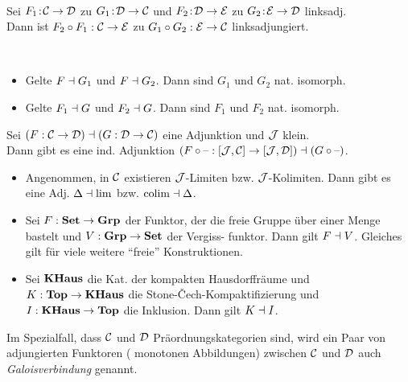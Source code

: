 \documentclass{cheat-sheet}
\begin{document}
\begin{lem}\mbox{}\\
  Sei $F_1 \!:\! \mathcal{C} \to \mathcal{D}$ zu $G_1 \!:\! \mathcal{D} \to \mathcal{C}$ und $F_2 \!:\! \mathcal{D} \to \mathcal{E}$ zu $G_2 \!:\! \mathcal{E} \to \mathcal{D}$ linksadj. \\
  Dann ist $F_2 \circ F_1 : \mathcal{C} \to \mathcal{E}$ zu $G_1 \circ G_2 : \mathcal{E} \to \mathcal{C}$ linksadjungiert.
\end{lem}

\begin{lem}\mbox{}\\
  \begin{itemize}
    \item Gelte $F \dashv G_1$ und $F \dashv G_2$. Dann sind $G_1$ und $G_2$ nat. isomorph.
    \item Gelte $F_1 \dashv G$ und $F_2 \dashv G$. Dann sind $F_1$ und $F_2$ nat. isomorph.
  \end{itemize}
\end{lem}

\begin{bem}
  Sei $(F : \mathcal{C} \to \mathcal{D}) \dashv (G : \mathcal{D} \to \mathcal{C})$ eine Adjunktion und $\mathcal{J}$ klein. \\
  Dann gibt es eine ind. Adjunktion $(F \circ \text{--} : [\mathcal{J}, \mathcal{C}] \to [\mathcal{J}, \mathcal{D}]) \dashv (G \circ \text{--})$.
\end{bem}

\begin{bspe}
  \begin{itemize}
    \item Angenommen, in $\mathcal{C}$ existieren $\mathcal{J}$-Limiten bzw. $\mathcal{J}$-Kolimiten. Dann gibt es eine Adj.
    $\Delta \dashv \lim$
    bzw.
    $\operatorname{colim} \dashv \Delta$.
    \item Sei $F : \mathbf{Set} \to \mathbf{Grp}$ der Funktor, der die freie Gruppe über einer Menge bastelt und $V : \mathbf{Grp} \to \mathbf{Set}$ der Vergiss- funktor. Dann gilt $F \dashv V$. Gleiches gilt für viele weitere "`freie"' Konstruktionen.
    \item Sei $\mathbf{KHaus}$ die Kat. der kompakten Hausdorffräume und $K : \mathbf{Top} \to \mathbf{KHaus}$ die Stone-Čech-Kompaktifizierung und $I : \mathbf{KHaus} \to \mathbf{Top}$ die Inklusion. Dann gilt $K \dashv I$.
  \end{itemize}
\end{bspe}

\begin{defn}
  Im Spezialfall, dass $\mathcal{C}$ und $\mathcal{D}$ Präordnungskategorien sind, wird ein Paar von adjungierten Funktoren (\dh{} monotonen Abbildungen) zwischen $\mathcal{C}$ und $\mathcal{D}$ auch \emph{Galoisverbindung} genannt.
\end{defn}
\end{document}

